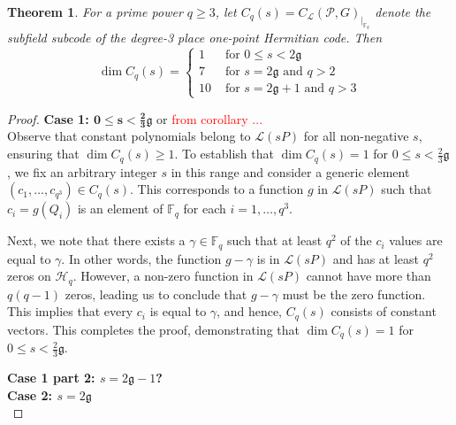 \documentclass[a4paper]{amsart}
\theoremstyle{plain}
\newtheorem{theorem}{Theorem}[section]
\theoremstyle{definition}
\theoremstyle{remark}
\newcommand{\g}{\mathfrak{g}}
\begin{document}
\begin{theorem}
	For a prime power $q \geq 3$, let $C_q (s)=C_{\mathcal{L}}( \mathcal{P},G)_{|_{\mathbb{F}_q}}$ denote the subfield subcode of the degree-3 place one-point Hermitian code. Then 
	\[ \dim C_{q}(s)= \begin{cases} 1 & \text { for } 0 \leq s<2\mathfrak{g} \\ 7 & \text { for } s=2\mathfrak{g} \text{ and } q>2\\ 10 & \text{ for } s=2\g +1 \text{ and } q>3\end{cases}\]
	
	
\end{theorem}
\begin{proof}
	\textbf{Case 1: $\mathbf{0 \leq s <\frac{2}{3}\g}$} or \textcolor{red}{from corollary ...}\\
	Observe that constant polynomials belong to $\mathscr{L}(sP)$ for all non-negative $s$, ensuring that $\dim C_{q}(s)\geq 1$. To establish that $\dim C_{q}(s) = 1$ for $0 \leq s <\frac{2}{3}\g$, we fix an arbitrary integer $s$ in this range and consider a generic element $(c_1,\ldots,c_{q^3}) \in C_{q}(s)$. This corresponds to a function $g$ in $\mathscr{L}(sP)$ such that $c_i=g(Q_i)$ is an element of $\mathbb{F}_q$ for each $i=1,\ldots,q^3$. 
	
	Next, we note that there exists a $\gamma \in \mathbb{F}_q$ such that at least $q^2$ of the $c_i$ values are equal to $\gamma$. In other words, the function $g-\gamma$ is in $\mathscr{L}(sP)$ and has at least $q^2$ zeros on $\mathscr{H}_q$. However, a non-zero function in $\mathscr{L}(sP)$ cannot have more than $q(q-1)$ zeros, leading us to conclude that $g-\gamma$ must be the zero function. This implies that every $c_i$ is equal to $\gamma$, and hence, $C_{q}(s)$ consists of constant vectors. This completes the proof, demonstrating that $\dim C_{q}(s) = 1$ for $0 \leq s <\frac{2}{3}\g$.
	
	\textbf{Case 1 part 2: $s=2\mathfrak{g}-1$?}\\
	
	
	
	\textbf{Case 2: $s=2\mathfrak{g}$}\\
	
	
	

\end{proof}
\end{document}
